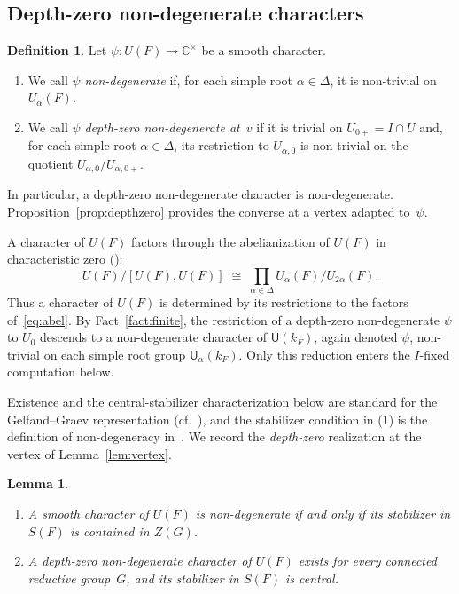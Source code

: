 \documentclass[11pt]{amsart}
\newtheorem{lemma}[theorem]{Lemma}
\theoremstyle{definition}
\newtheorem{definition}[theorem]{Definition}
\theoremstyle{remark}
\newcommand{\CC}{\mathbb{C}}
\begin{document}
\subsection{Depth-zero non-degenerate characters}\label{ssec:psi}

\begin{definition}\label{def:psi}
Let $\psi \colon U(F) \to \CC^\times$ be a smooth character.
\begin{enumerate}[\upshape(1)]
\item We call $\psi$ \emph{non-degenerate} if, for each simple root $\alpha\in\Delta$, it is non-trivial on $U_\alpha(F)$.
\item We call $\psi$ \emph{depth-zero non-degenerate at~$v$} if it is trivial on $U_{0+} = I\cap U$ and, for each simple root $\alpha \in \Delta$, its restriction to $U_{\alpha,0}$ is non-trivial on the quotient $U_{\alpha,0}/U_{\alpha,0+}$.
\end{enumerate}
\end{definition}

In particular, a depth-zero non-degenerate character is non-degenerate. Proposition~\ref{prop:depthzero} provides the converse at a vertex adapted to~$\psi$.

A character of $U(F)$ factors through the abelianization of $U(F)$ in characteristic zero (\cite[Thm.~4.1, Cor.~5.3]{BHder}):
\begin{equation}\label{eq:abel}
U(F)/[U(F),U(F)] \;\cong\; \prod_{\alpha\in\Delta} U_\alpha(F)/U_{2\alpha}(F).
\end{equation} 
Thus a character of $U(F)$ is determined by its restrictions to the factors of~\eqref{eq:abel}. By Fact~\ref{fact:finite}, the restriction of a depth-zero non-degenerate $\psi$ to $U_0$ descends to a non-degenerate character of $\mathsf{U}(k_F)$, again denoted $\psi$, non-trivial on each simple root group $\mathsf{U}_\alpha(k_F)$. Only this reduction enters the $I$-fixed computation below.

Existence and the central-stabilizer characterization below are standard for the Gelfand--Graev representation (cf.~\cite{BH}), and the stabilizer condition in (1) is the definition of non-degeneracy in~\cite{MP}. We record the \emph{depth-zero} realization at the vertex of Lemma~\ref{lem:vertex}.

\begin{lemma}\label{lem:exists}
\begin{enumerate}[\upshape(1)]
\item A smooth character of $U(F)$ is non-degenerate if and only if its stabilizer in $S(F)$ is contained in $Z(G)$.
\item A depth-zero non-degenerate character of $U(F)$ exists for every connected reductive group~$G$, and its stabilizer in $S(F)$ is central.
\end{enumerate}
\end{lemma}
\end{document}
